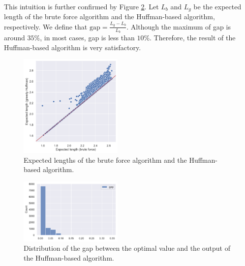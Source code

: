 This intuition is further confirmed by Figure \ref{fig:greedy_huffman_2}. Let $L_b$ and $L_g$ be the expected length of the brute force algorithm and the Huffman-based algorithm, respectively. We define that $\text{gap} = \frac{L_g-L_b}{L_b}$. Although the maximum of gap is around $35\%$, in most cases, gap is less than $10\%$. Therefore, the result of the Huffman-based algorithm is very satisfactory.

\begin{figure}[H]
    \centering
    \includegraphics[width=0.45\textwidth]{figure/greedy_huffman_fig1.png}
    \caption{Expected lengths of the brute force algorithm and the Huffman-based algorithm.}
    \label{fig:greedy_huffman_1}
\end{figure}



\begin{figure}[H]
    \centering
    \includegraphics[width=0.45\textwidth]{figure/greedy_huffman_fig2.pdf}
    \caption{Distribution of the gap between the optimal value and the output of the Huffman-based algorithm.}
    \label{fig:greedy_huffman_2}
\end{figure}